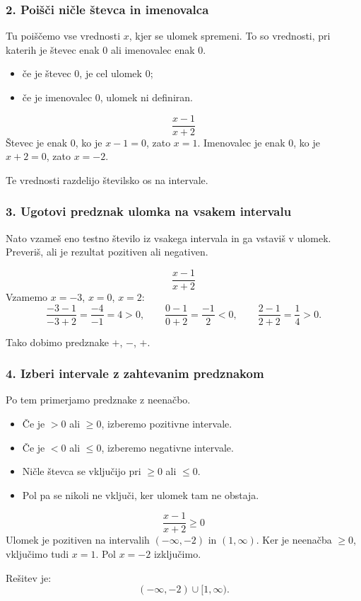 \documentclass[11pt]{article}
\begin{document}
\subsubsection*{2. Poišči ničle števca in imenovalca}
Tu poiščemo vse vrednosti $x$, kjer se ulomek spremeni. To so vrednosti, pri katerih je števec enak 0 ali imenovalec enak 0.

\begin{itemize}[leftmargin=*]
  \item če je števec 0, je cel ulomek 0;
  \item če je imenovalec 0, ulomek ni definiran.
\end{itemize}
\begin{primerbox}
\[
\frac{x-1}{x+2}
\]
Števec je enak $0$, ko je $x-1=0$, zato $x=1$. Imenovalec je enak $0$, ko je $x+2=0$, zato $x=-2$.

Te vrednosti razdelijo številsko os na intervale.
\end{primerbox}

\subsubsection*{3. Ugotovi predznak ulomka na vsakem intervalu}
Nato vzameš eno testno število iz vsakega intervala in ga vstaviš v ulomek. Preveriš, ali je rezultat pozitiven ali negativen.

\begin{primerbox}
\[
\frac{x-1}{x+2}
\]
Vzamemo $x=-3$, $x=0$, $x=2$:
\[
\frac{-3-1}{-3+2}=\frac{-4}{-1}=4>0,
\qquad
\frac{0-1}{0+2}=\frac{-1}{2}<0,
\qquad
\frac{2-1}{2+2}=\frac{1}{4}>0.
\]

Tako dobimo predznake $+$, $-$, $+$.
\end{primerbox}

\subsubsection*{4. Izberi intervale z zahtevanim predznakom}
Po tem primerjamo predznake z neenačbo.

\begin{itemize}[leftmargin=*]
  \item Če je $>0$ ali $\ge 0$, izberemo pozitivne intervale.
  \item Če je $<0$ ali $\le 0$, izberemo negativne intervale.
  \item Ničle števca se vključijo pri $\ge 0$ ali $\le 0$.
  \item Pol pa se nikoli ne vključi, ker ulomek tam ne obstaja.
\end{itemize}
\begin{primerbox}
\[
\frac{x-1}{x+2}\ge 0
\]
Ulomek je pozitiven na intervalih $(-\infty,-2)$ in $(1,\infty)$. Ker je neenačba $\ge 0$, vključimo tudi $x=1$. Pol $x=-2$ izključimo.

Rešitev je:
\[
\boxed{(-\infty,-2)\cup[1,\infty)}.
\]
\end{primerbox}
\end{document}

